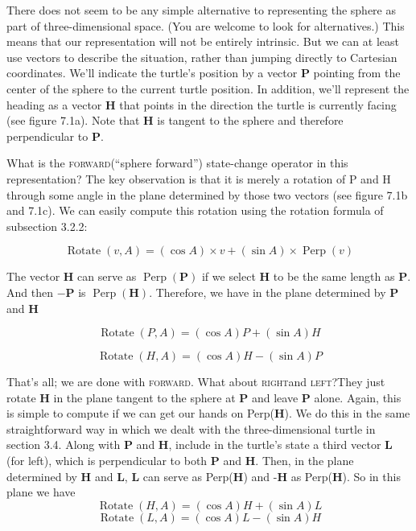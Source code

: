 \documentclass{book}
\begin{document}
There does not seem to be any simple alternative to representing the
sphere as part of three-dimensional space. (You are welcome to look for
alternatives.) This means that our representation will not be entirely
intrinsic. But we can at least use vectors to describe the situation,
rather than jumping directly to Cartesian coordinates. We'll indicate
the turtle's position by a vector \textbf{P} pointing from the center of the sphere
to the current turtle position. In addition, we'll represent the heading
as a vector \textbf{H} that points in the direction the turtle is currently facing
(see figure 7.1a). Note that \textbf{H} is tangent to the sphere and therefore
perpendicular to \textbf{P}.

What is the \textsc{forward}(``sphere forward'') state-change operator in this
representation? The key observation is that it is merely a rotation of P
and H through some angle in the plane determined by those two vectors
(see figure 7.1b and 7.1c). We can easily compute this rotation using the
rotation formula of subsection 3.2.2:

$$\operatorname{Rotate}(v,A) = (\cos A) \times v + (\sin A) \times \operatorname{Perp}(v)$$

The vector \textbf{H} can serve as $\operatorname{Perp}(\mathbf{P})$ if we select \textbf{H} to be the same length as
\textbf{P}. And then $-\mathbf{P}$ is $\operatorname{Perp}(\mathbf{H})$. Therefore, we have in the plane determined
by \textbf{P} and \textbf{H}

$$ \operatorname{Rotate}(P,A) = (\cos A)P + (\sin A)H $$

$$ \operatorname{Rotate}(H,A) = (\cos A)H - (\sin A)P $$

That's all; we are done with \textsc{forward}.
What about \textsc{right}and \textsc{left}?They just rotate \textbf{H} in the plane tangent
to the sphere at \textbf{P} and leave \textbf{P} alone. Again, this is simple to compute
if we can get our hands on Perp(\textbf{H}). We do this in the same straightforward way in which we dealt with the three-dimensional turtle in section
3.4. Along with \textbf{P} and \textbf{H}, include in the turtle's state a third vector \textbf{L}
(for left), which is perpendicular to both \textbf{P} and \textbf{H}. Then, in the plane
determined by \textbf{H} and \textbf{L}, \textbf{L} can serve as Perp(\textbf{H}) and -\textbf{H} as Perp(\textbf{H}). So
in this plane we have $$\operatorname{Rotate}(H, A) = (\cos A)H + (\sin A)L$$
$$\operatorname{Rotate}(L, A) = (\cos A)L - (\sin A)H$$
\end{document}
